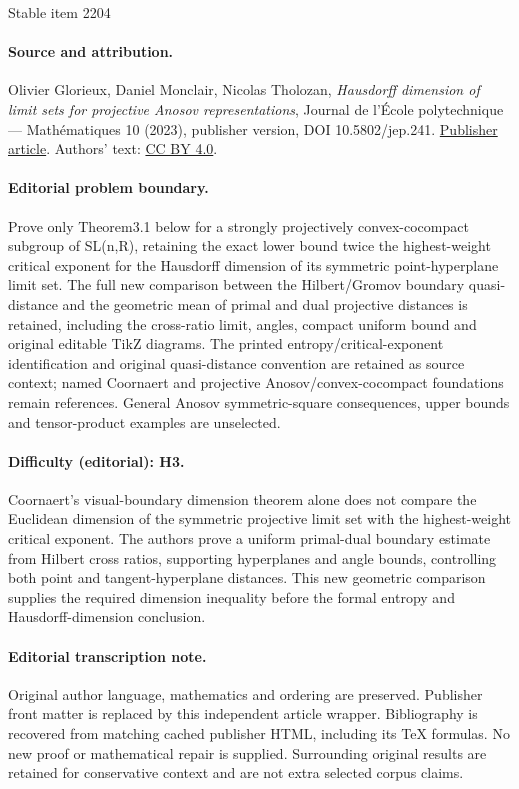 \documentclass[11pt]{article}
\numberwithin{equation}{section}
\theoremstyle{definition}
\begin{document}
\begin{center}{\Large Stable item 2204}\end{center}
\paragraph{Source and attribution.}
Olivier Glorieux, Daniel Monclair, Nicolas Tholozan, \emph{Hausdorff dimension of limit sets for projective Anosov representations}, Journal de l’École polytechnique — Mathématiques 10 (2023), publisher version, DOI 10.5802/jep.241. \href{https://jep.centre-mersenne.org/articles/10.5802/jep.241/}{Publisher article}. Authors' text: \href{https://creativecommons.org/licenses/by/4.0/}{CC BY 4.0}.
\paragraph{Editorial problem boundary.}
Prove only Theorem3.1 below for a strongly projectively convex-cocompact subgroup of SL(n,R), retaining the exact lower bound twice the highest-weight critical exponent for the Hausdorff dimension of its symmetric point-hyperplane limit set. The full new comparison between the Hilbert/Gromov boundary quasi-distance and the geometric mean of primal and dual projective distances is retained, including the cross-ratio limit, angles, compact uniform bound and original editable TikZ diagrams. The printed entropy/critical-exponent identification and original quasi-distance convention are retained as source context; named Coornaert and projective Anosov/convex-cocompact foundations remain references. General Anosov symmetric-square consequences, upper bounds and tensor-product examples are unselected.
\paragraph{Difficulty (editorial): H3.}
Coornaert’s visual-boundary dimension theorem alone does not compare the Euclidean dimension of the symmetric projective limit set with the highest-weight critical exponent. The authors prove a uniform primal-dual boundary estimate from Hilbert cross ratios, supporting hyperplanes and angle bounds, controlling both point and tangent-hyperplane distances. This new geometric comparison supplies the required dimension inequality before the formal entropy and Hausdorff-dimension conclusion.
\paragraph{Editorial transcription note.}
Original author language, mathematics and ordering are preserved. Publisher front matter is replaced by this independent article wrapper. Bibliography is recovered from matching cached publisher HTML, including its TeX formulas. No new proof or mathematical repair is supplied. Surrounding original results are retained for conservative context and are not extra selected corpus claims.
\clearpage
\end{document}
